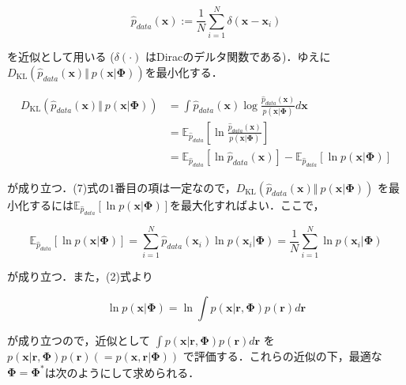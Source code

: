 \begin{equation}
\hat{p}_{data}(\mathbf{x}):=\frac{1}{N}\sum_{i=1}^N \delta(\mathbf{x}-\mathbf{x}_i)
\end{equation}


を近似として用いる ($\delta(\cdot)$ はDiracのデルタ関数である)．ゆえに$D_{\text{KL}}\left(\hat{p}_{data}(\mathbf{x}) \Vert\ p(\mathbf{x}|\mathbf{\Phi})\right)$を最小化する．


\begin{align}
D_{\text{KL}}\left(\hat{p}_{data}(\mathbf{x}) \Vert\ p(\mathbf{x}|\mathbf{\Phi})\right)&=\int \hat{p}_{data}(\mathbf{x}) \log \frac{\hat{p}_{data}(\mathbf{x})}{p(\mathbf{x}|\mathbf{\Phi})} d\mathbf{x}\\
&=\mathbb{E}_{\hat{p}_{data}} \left[\ln \frac{\hat{p}_{data}(\mathbf{x})}{p(\mathbf{x}|\mathbf{\Phi})}\right]\\
&=\mathbb{E}_{\hat{p}_{data}} \left[\ln \hat{p}_{data}(\mathbf{x})\right]-\mathbb{E}_{\hat{p}_{data}} \left[\ln p(\mathbf{x}|\mathbf{\Phi})\right]
\end{align}


が成り立つ．(7)式の1番目の項は一定なので，$D_{\text{KL}}\left(\hat{p}_{data}(\mathbf{x}) \Vert\ p(\mathbf{x}|\mathbf{\Phi})\right)$ を最小化するには$\mathbb{E}_{\hat{p}_{data}} \left[\ln p(\mathbf{x}|\mathbf{\Phi})\right]$を最大化すればよい．ここで，


\begin{equation}
\mathbb{E}_{\hat{p}_{data}} \left[\ln p(\mathbf{x}|\mathbf{\Phi})\right]=\sum_{i=1}^N \hat{p}_{data}(\mathbf{x}_i)\ln p(\mathbf{x}_i|\mathbf{\Phi})=\frac{1}{N}\sum_{i=1}^N \ln p(\mathbf{x}_i|\mathbf{\Phi})
\end{equation}


が成り立つ．また，(2)式より


\begin{equation}
\ln p(\mathbf{x}|\mathbf{\Phi})=\ln \int p(\mathbf{x}|\mathbf{r}, \mathbf{\Phi})p(\mathbf{r})d\mathbf{r}
\end{equation}


が成り立つので，近似として $\displaystyle \int p(\mathbf{x}|\mathbf{r}, \mathbf{\Phi})p(\mathbf{r})d\mathbf{r}$ を $p(\mathbf{x}|\mathbf{r}, \mathbf{\Phi})p(\mathbf{r}) \left(=p(\mathbf{x}, \mathbf{r}| \mathbf{\Phi})\right)$ で評価する．これらの近似の下，最適な$\mathbf{\Phi}=\mathbf{\Phi}^*$は次のようにして求められる．


